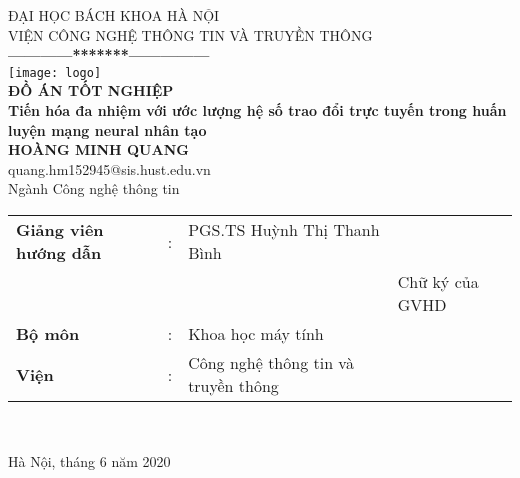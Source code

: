 \thispagestyle{empty}

\thisfancypage{
  \setlength{\fboxrule}{1pt}
  \doublebox}{}
\begin{center}

{
{\fontsize{12}{12}\selectfont ĐẠI HỌC BÁCH KHOA HÀ NỘI\\VIỆN CÔNG NGHỆ THÔNG TIN VÀ TRUYỀN THÔNG}\\
\textbf{------------*******---------------}\\[1cm]
\texttt{[image: logo]}
\centering
\\[1cm]
{\fontsize{25}{43}\selectfont \textbf{ĐỒ ÁN TỐT NGHIỆP}}\\[0.1cm]
{\fontsize{21}{26}\selectfont \textbf{Tiến hóa đa nhiệm với ước lượng hệ số trao đổi trực tuyến trong huấn luyện mạng neural nhân tạo}}\\[0.3cm]
{\fontsize{14}{20}\selectfont \textbf{HOÀNG MINH QUANG} \\
\fontsize{12}{18}\selectfont quang.hm152945@sis.hust.edu.vn}\\[0.3cm]

{\fontsize{17}{10}\selectfont Ngành Công nghệ thông tin}\\[1.5cm]

\begin{tabular}{l c l l}
  \textbf{Giảng viên hướng dẫn} & : &  PGS.TS Huỳnh Thị Thanh Bình & \text{\_\_\_\_\_\_\_\_\_\_\_\_\_} \\
  & & & \fontsize{10}{12}\selectfont Chữ ký của GVHD\\
  \textbf{Bộ môn} & : &  Khoa học máy tính \\
  \textbf{Viện} & : &  Công nghệ thông tin và truyền thông \\
\end{tabular} \\[2.0cm]
}

\fontsize{17}{19}\selectfont Hà Nội, tháng 6 năm 2020
\end{center}
\pagebreak